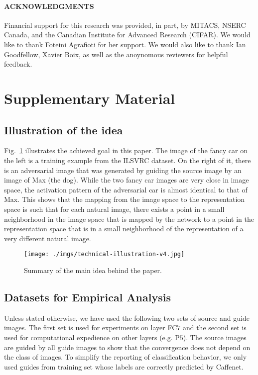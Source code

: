 \documentclass{article} %
\newcommand{\beginsupplement}{%
\renewcommand{\thesection}{}%
\renewcommand{\thesubsection}{S\arabic{subsection}}%
        \setcounter{table}{0}
        \renewcommand{\thetable}{S\arabic{table}}%
        \setcounter{figure}{0}
        \renewcommand{\thefigure}{S\arabic{figure}}%
     }
\begin{document}
\begin{footnotesize}
\paragraph{ACKNOWLEDGMENTS}  Financial support for this research was 
provided, in part, by MITACS, NSERC Canada, and the Canadian Institute 
for Advanced Research (CIFAR). We would like to thank Foteini Agrafioti 
for her support. We would also like to thank Ian Goodfellow, Xavier Boix, 
as well as the anoynomous reviewers for helpful feedback.
\end{footnotesize}


\vfill

\newpage
\beginsupplement\section*{Supplementary Material}\label{}\subsection{Illustration of the idea}
Fig.~\ref{fig:illustrate} illustrates the achieved goal in this paper. The 
image of the fancy car on the left is a training example from the ILSVRC 
dataset. On the right of it, there is an adversarial image that was generated 
by guiding the source image by an image of Max (the dog). While the two fancy 
car images are very close in image space, the activation pattern of the 
adversarial car is almost identical to that of Max.  This shows that the 
mapping from the image space to the representation space is such that for each 
natural image, there exists a point in a small neighborhood in the image space 
that is mapped by the network to a point in the representation space that is in 
a small neighborhood of the representation of a very different natural image.

\begin{figure}[h]
\centering
\texttt{[image: ./imgs/technical-illustration-v4.jpg]}
\caption{Summary of the main idea behind the paper.} \label{fig:illustrate}
\vspace*{-0.2cm}
\end{figure}\subsection{Datasets for Empirical Analysis}

Unless stated otherwise,  we have used the following two sets of source and 
guide images. The first set is used for experiments on layer FC$7$ and the 
second set is used for computational expedience on other layers (e.g.  P$5$). 
The source images are guided by all guide images to show that the convergence 
does not depend on the class of images. To simplify the reporting of 
classification behavior, we only used guides from training set whose labels are 
correctly predicted by Caffenet.
\end{document}
